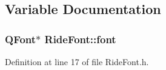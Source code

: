 \subsection{Variable Documentation}
\hypertarget{namespace_ride_font_a490a1d138dbd38b50c4fa67d5ae2242b}{
\subsubsection[{font}]{\setlength{\rightskip}{0pt plus 5cm}Q\-Font$\ast$ Ride\-Font\-::font}}\label{namespace_ride_font_a490a1d138dbd38b50c4fa67d5ae2242b}


Definition at line 17 of file Ride\-Font.\-h.

